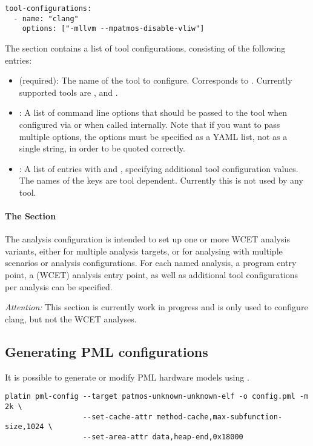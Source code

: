 \begin{verbatim}
tool-configurations:
  - name: "clang"
    options: ["-mllvm --mpatmos-disable-vliw"]
\end{verbatim}

The section contains a list of tool configurations, consisting of the following entries:
\begin{itemize}
\item {} (required): The name of the tool to configure. Corresponds to . Currently supported
  tools are ,  and . 
\item {}: A list of command line options that should be passed to the tool when configured via  or 
  when called internally. Note that if you want to pass multiple options, the options must be specified as a YAML list, not as a 
  single string, in order to be quoted correctly.
\item {}: A list of entries with  and , specifying additional tool configuration values.
  The names of the keys are tool dependent. 
  Currently this is not used by any tool.
\end{itemize}

\paragraph{The  Section}

The analysis configuration is intended to set up one or more WCET analysis variants, either for 
multiple analysis targets, or for analysing with multiple scenarios or analysis configurations.
For each named analysis, a program entry point, a (WCET) analysis entry point, as well as additional tool configurations
per analysis can be specified.

\emph{Attention:} This section is currently work in progress and is only used to configure clang, but not the WCET analyses.


\subsection{Generating PML configurations}

It is possible to generate or modify PML hardware models using .

\begin{verbatim}
platin pml-config --target patmos-unknown-unknown-elf -o config.pml -m 2k \
                  --set-cache-attr method-cache,max-subfunction-size,1024 \
                  --set-area-attr data,heap-end,0x18000
\end{verbatim}

